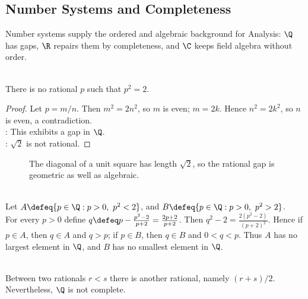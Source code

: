 \subsection{Number Systems and Completeness}

%


Number systems supply the ordered and algebraic background for Analysis: $\Q$ has gaps, $\R$ repairs them by completeness, and $\C$ keeps field algebra without order.

\begin{proposition} \label{prop:rational-square-root-two-gap} \\
There is no rational $p$ such that $p^2=2$.
\begin{proof} Let $p=m/n$. Then $m^2=2n^2$, so $m$ is even; $m=2k$. Hence $n^2=2k^2$, so $n$ is even, a contradiction.\\
: This exhibits a gap in $\Q$.\\
: $\sqrt{2}$ is not rational.
\end{proof}
\end{proposition}

\begin{figure}[H]
  \centering
  
  \caption{The diagonal of a unit square has length $\sqrt{2}$, so the rational gap is geometric as well as algebraic.}
  \label{fig:unit-square-sqrt-two}
\end{figure}

\begin{example} \label{ex:rational-cut-around-square-root-two} \\
Let $A\defeq\{p\in\Q:p>0,\ p^2<2\}$, and $B\defeq\{p\in\Q:p>0,\ p^2>2\}$.\\
For every $p>0$ define $q\defeq p-\frac{p^2-2}{p+2}=\frac{2p+2}{p+2}$. Then $q^2-2=\frac{2(p^2-2)}{(p+2)^2}$.
Hence if $p\in A$, then $q\in A$ and $q>p$; if $p\in B$, then $q\in B$ and $0<q<p$. Thus $A$ has no largest element in $\Q$, and $B$ has no smallest element in $\Q$.
\end{example}

\begin{remark} \label{rem:rational-density-does-not-fill-gaps} \\
Between two rationals $r<s$ there is another rational, namely $(r+s)/2$. Nevertheless, $\Q$ is not complete.
\end{remark}

